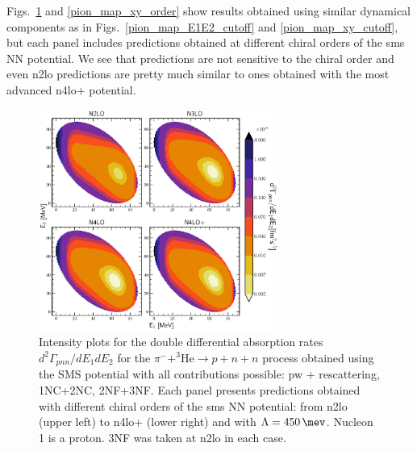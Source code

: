     Figs.~\ref{pion_map_E1E2_order} and \ref{pion_map_xy_order} show results obtained using similar
    dynamical components
    as in Figs.~\ref{pion_map_E1E2_cutoff} and \ref{pion_map_xy_cutoff}, but each panel includes
    predictions obtained at different chiral orders of the \gls{sms} NN potential.
    We see that predictions are not sensitive to the chiral order and even \gls{n2lo} predictions
    are pretty much similar to ones obtained with the most advanced \gls{n4lo+} potential.
     
    
    \begin{figure}[h]
        \begin{center}
            \includegraphics[width=0.7\textwidth]{PlotData/PION/Dalitz_maps/figures/Dalitz_map_pnn_E1E2_orders.pdf}
        \end{center}
        \caption{Intensity plots for the double differential absorption rates
        $d^2 \Gamma_{pnn}/dE_1dE_2$ for the $\pi^- + ^3\text{He} \rightarrow p + n + n$
        process obtained using the SMS potential
        with all contributions possible: \gls{pw} + rescattering, 1NC+2NC, 2NF+3NF.
        Each panel presents predictions obtained with different chiral orders of the \gls{sms} NN potential:
        from \gls{n2lo} (upper left) to \gls{n4lo+} (lower right) and with $\Lambda = \SI{450}{\mev}$.
        Nucleon 1 is a proton. 3NF was taken at \gls{n2lo} in each case.}
        \label{pion_map_E1E2_order}
    \end{figure}

